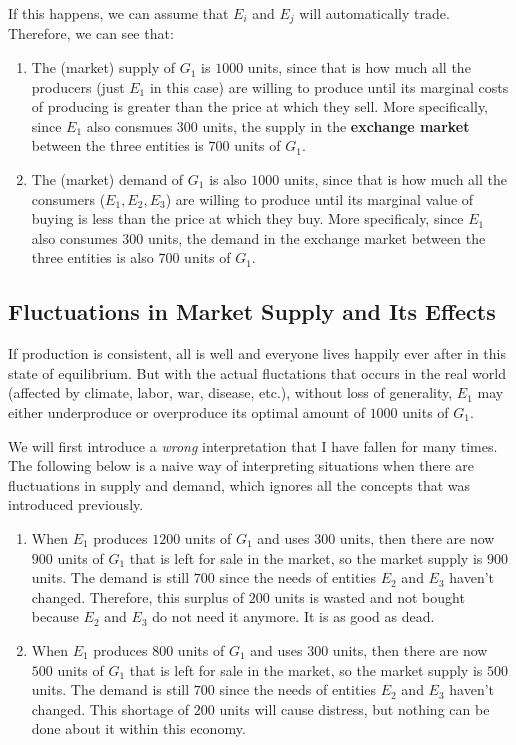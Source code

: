 \documentclass{article}
\begin{document}
    If this happens, we can assume that $E_i$ and $E_j$ will automatically trade. Therefore, we can see that:
    \begin{enumerate}
      \item The (market) supply of $G_1$ is $1000$ units, since that is how much all the producers (just $E_1$ in this case) are willing to produce until its marginal costs of producing is greater than the price at which they sell. More specifically, since $E_1$ also consmues $300$ units, the supply in the \textbf{exchange market} between the three entities is $700$ units of $G_1$.
      \item The (market) demand of $G_1$ is also $1000$ units, since that is how much all the consumers ($E_1, E_2, E_3$) are willing to produce until its marginal value of buying is less than the price at which they buy. More specificaly, since $E_1$ also consumes $300$ units, the demand in the exchange market between the three entities is also $700$ units of $G_1$.
    \end{enumerate}

  \subsection{Fluctuations in Market Supply and Its Effects}

    If production is consistent, all is well and everyone lives happily ever after in this state of equilibrium. But with the actual fluctations that occurs in the real world (affected by climate, labor, war, disease, etc.), without loss of generality, $E_1$ may either underproduce or overproduce its optimal amount of $1000$ units of $G_1$.

    We will first introduce a \textit{wrong} interpretation that I have fallen for many times. The following below is a naive way of interpreting situations when there are fluctuations in supply and demand, which ignores all the concepts that was introduced previously.

    \begin{enumerate}
      \item When $E_1$ produces $1200$ units of $G_1$ and uses $300$ units, then there are now $900$ units of $G_1$ that is left for sale in the market, so the market supply is $900$ units. The demand is still $700$ since the needs of entities $E_2$ and $E_3$ haven't changed. Therefore, this surplus of $200$ units is wasted and not bought because $E_2$ and $E_3$ do not need it anymore. It is as good as dead.
      \item When $E_1$ produces $800$ units of $G_1$ and uses $300$ units, then there are now $500$ units of $G_1$ that is left for sale in the market, so the market supply is $500$ units. The demand is still $700$ since the needs of entities $E_2$ and $E_3$ haven't changed. This shortage of $200$ units will cause distress, but nothing can be done about it within this economy.
    \end{enumerate}
\end{document}
